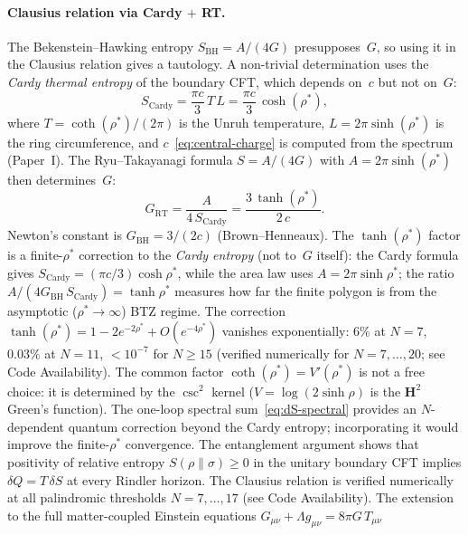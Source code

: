\paragraph{Clausius relation via Cardy $+$ RT.}
The Bekenstein--Hawking entropy $S_{\mathrm{BH}} = A/(4G)$
presupposes~$G$, so using it in the Clausius relation gives
a tautology.
A non-trivial determination uses the \emph{Cardy thermal entropy}
of the boundary CFT, which depends on~$c$ but not on~$G$:
\begin{equation}\label{eq:cardy-entropy}
  S_{\mathrm{Cardy}}
  = \frac{\pi c}{3}\,T\,L
  = \frac{\pi c}{3}\,\cosh(\rho^*),
\end{equation}
where $T = \coth(\rho^*)/(2\pi)$ is the Unruh temperature,
$L = 2\pi\sinh(\rho^*)$ is the ring circumference,
and $c$~\eqref{eq:central-charge} is computed from the spectrum (Paper~I).
The Ryu--Takayanagi formula $S = A/(4G)$ with
$A = 2\pi\sinh(\rho^*)$ then determines~$G$:
\begin{equation}\label{eq:clausius}
  G_{\mathrm{RT}}
  = \frac{A}{4\,S_{\mathrm{Cardy}}}
  = \frac{3\,\tanh(\rho^*)}{2\,c}.
\end{equation}
Newton's constant is $G_{\mathrm{BH}} = 3/(2c)$
(Brown--Henneaux).
The $\tanh(\rho^*)$ factor is a finite-$\rho^*$
correction to the \emph{Cardy entropy}
(not to~$G$ itself): the Cardy formula gives
$S_{\mathrm{Cardy}} = (\pi c/3)\cosh\rho^*$,
while the area law uses $A = 2\pi\sinh\rho^*$;
the ratio $A/(4G_{\mathrm{BH}}\,S_{\mathrm{Cardy}})
= \tanh\rho^*$
measures how far the finite polygon is from the
asymptotic ($\rho^* \to \infty$) BTZ regime.
The correction $\tanh(\rho^*) = 1 - 2e^{-2\rho^*}
+ O(e^{-4\rho^*})$ vanishes exponentially:
$6\%$ at $N = 7$, $0.03\%$ at $N = 11$,
$< 10^{-7}$ for $N \ge 15$
(verified numerically for $N = 7,\ldots,20$;
see Code Availability).
The common factor $\coth(\rho^*) = V'(\rho^*)$ is not a
free choice: it is determined by the $\csc^2$ kernel
($V = \log(2\sinh\rho)$ is the $\mathbf{H}^2$ Green's function).
The one-loop spectral sum~\eqref{eq:dS-spectral} provides
an $N$-dependent quantum correction beyond the Cardy entropy;
incorporating it would improve the finite-$\rho^*$ convergence.
The \citet{Lashkari2014}
entanglement argument shows that positivity of relative entropy
$S(\rho\|\sigma) \ge 0$ in the unitary boundary CFT implies
$\delta Q = T\,\delta S$ at every Rindler horizon.
The Clausius relation is verified numerically at all
palindromic thresholds $N = 7, \ldots, 17$
(see Code Availability).
The extension to the full matter-coupled Einstein equations
$G_{\mu\nu} + \Lambda g_{\mu\nu} = 8\pi G\,T_{\mu\nu}$
